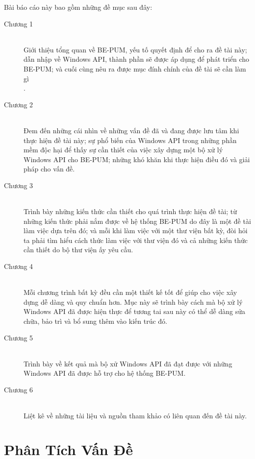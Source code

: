 \documentclass[14pt]{hcmutarticle}
\begin{document}
Bài báo cáo này bao gồm những đề mục sau đây:

\begin{description}
  	\item[Chương 1] \hfill \\
	Giới thiệu tổng quan về BE-PUM, yếu tố quyết  định để cho ra đề tài này; dẫn nhập về Windows API, thành phần sẽ được áp dụng để phát triển cho BE-PUM; và cuối cùng nêu ra được mục đính chính của đề tài sẽ cần làm gì\\.
 	\item[Chương 2] \hfill \\
	Đem đến những cái nhìn về những vấn đề đã và đang được lưu tâm khi thực hiện đề tài này; sự phổ biến của Windows API trong những phần mềm độc hại để thấy sự cần thiết của việc xây dựng một bộ xử lý Windows API cho BE-PUM; những khó khăn khi thực hiện điều đó và giải pháp cho vấn đề.\\
	\item[Chương 3] \hfill \\
	Trình bày những kiến thức cần thiết cho quá trình thực hiện đề tài; từ những kiến thức phải nắm được về hệ thống BE-PUM do đây là một đề tài làm việc dựa trên đó; và mỗi khi làm việc với một thư viện bất kỳ, đòi hỏi ta phải tìm hiểu cách thức làm việc với thư viện đó và cả những kiến thức cần thiết do bộ thư viện ấy yêu cầu. \\
	\item[Chương 4] \hfill \\
	Mỗi chương trình bất kỳ đều cần một thiết kế tốt để giúp cho việc xây dựng dễ dàng và quy chuẩn hơn. Mục này sẽ trình bày cách mà bộ xử lý Windows API đã được hiện thực để tương tai sau này có thể dễ dàng sửa chữa, bảo trì và bổ sung thêm vào kiến trúc đó.\\
	\item[Chương 5] \hfill \\
	 Trình bày về kết quả mà bộ xử Windows API đã đạt được với những Windows API đã được hỗ trợ cho hệ thống BE-PUM.\\
	\item[Chương 6] \hfill \\
	 Liệt kê về những tài liệu và nguồn tham khảo có liên quan đến đề tài này.\\
\end{description}


\chapter{Phân Tích Vấn Đề}
\end{document}

